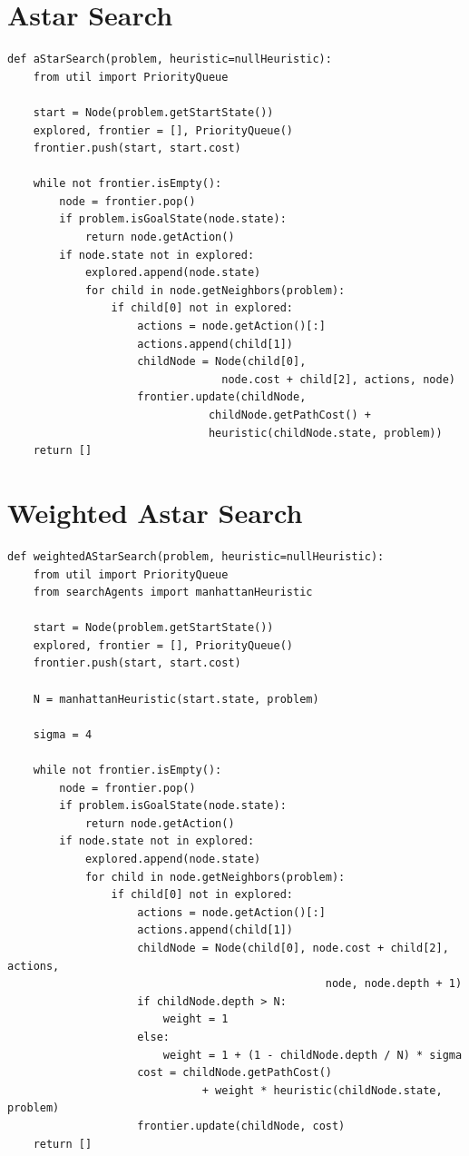 \documentclass[a4paper,12pt]{report}
\begin{document}
\section{Astar Search}

\begin{Verbatim}[frame=single]
def aStarSearch(problem, heuristic=nullHeuristic):
    from util import PriorityQueue

    start = Node(problem.getStartState())
    explored, frontier = [], PriorityQueue()
    frontier.push(start, start.cost)

    while not frontier.isEmpty():
        node = frontier.pop()
        if problem.isGoalState(node.state):
            return node.getAction()
        if node.state not in explored:
            explored.append(node.state)
            for child in node.getNeighbors(problem):
                if child[0] not in explored:
                    actions = node.getAction()[:]
                    actions.append(child[1])
                    childNode = Node(child[0],
                                 node.cost + child[2], actions, node)
                    frontier.update(childNode, 
                               childNode.getPathCost() + 
                               heuristic(childNode.state, problem))
    return []
\end{Verbatim}

\section{Weighted Astar Search}

\begin{Verbatim}[frame=single]
def weightedAStarSearch(problem, heuristic=nullHeuristic):
    from util import PriorityQueue
    from searchAgents import manhattanHeuristic

    start = Node(problem.getStartState())
    explored, frontier = [], PriorityQueue()
    frontier.push(start, start.cost)

    N = manhattanHeuristic(start.state, problem)

    sigma = 4

    while not frontier.isEmpty():
        node = frontier.pop()
        if problem.isGoalState(node.state):
            return node.getAction()
        if node.state not in explored:
            explored.append(node.state)
            for child in node.getNeighbors(problem):
                if child[0] not in explored:
                    actions = node.getAction()[:]
                    actions.append(child[1])
                    childNode = Node(child[0], node.cost + child[2], actions,
                                                 node, node.depth + 1)
                    if childNode.depth > N:
                        weight = 1
                    else:
                        weight = 1 + (1 - childNode.depth / N) * sigma
                    cost = childNode.getPathCost()
                              + weight * heuristic(childNode.state, problem)
                    frontier.update(childNode, cost)
    return []
\end{Verbatim}
\end{document}
